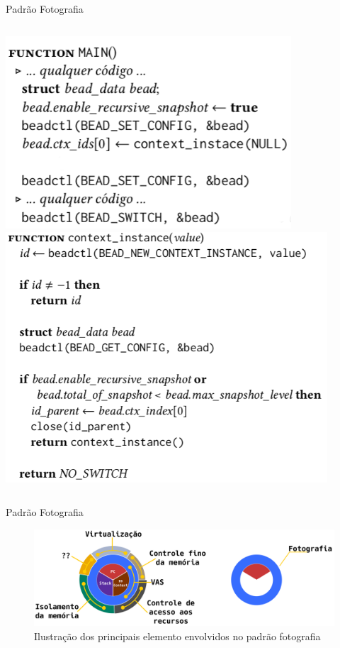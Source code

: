 \documentclass[xcolor={usenames,svgnames,dvipsnames},brazil,english,12pt,aspectratio=149]{beamer}
\newcommand\col{\column{.5\textwidth}}
\begin{document}
\begin{frame}{Padrão Fotografia}
  \begin{columns}[t]
    \col
      \centering
      \includegraphics[width=0.8\textwidth]{snapshotOne}
    \col
      \centering
      \includegraphics[width=0.9\textwidth]{snapshotTwo}
  \end{columns}
\end{frame}

\begin{frame}{Padrão Fotografia}
  \begin{figure}[!h]
    \centering
    \includegraphics[width=.8\textwidth]{decomposition_fotografia}
    \caption*{Ilustração dos principais elemento envolvidos no padrão fotografia}
  \end{figure}
\end{frame}
\end{document}

